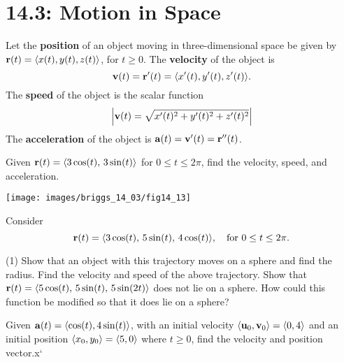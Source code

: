 \documentclass[mathNotesPreamble]{subfiles}
\begin{document}
\section{14.3: Motion in Space}
  \begin{defn*}
    Let the \textbf{position} of an object moving in three-dimensional space be given by \newline${\mathbf{r}}(t)={\left\langle x(t),y(t),z(t) \right\rangle}$, for $t\geq 0$. The \textbf{velocity} of the object is
      \[{\mathbf{v}}(t)={\mathbf{r}}'(t)={\left\langle x'(t),y'(t),z'(t) \right\rangle}.\]
    The \textbf{speed} of the object is the scalar function
      \[{\left\vert{\mathbf{v}}(t)=\sqrt{x'(t)^2+y'(t)^2+z'(t)^2}\right\vert}\]
    The \textbf{acceleration} of the object is $\mathbf a(t)={\mathbf{v}}'(t)={\mathbf{r}}''(t)$.
  \end{defn*}
  \begin{ex*}
    Given ${\mathbf{r}}(t)={\left\langle 3\cos(t),\,3\sin(t) \right\rangle}$ for $0\leq t\leq 2\pi$, find the velocity, speed, and acceleration.
  \end{ex*}
  \begin{flushright}
    \texttt{[image: images/briggs\_14\_03/fig14\_13]}
  \end{flushright}
  \pagebreak

  \noindent
  \begin{ex*}
    Consider
      \[{\mathbf{r}}(t)={\left\langle 3\cos(t),\,5\sin(t),\,4\cos(t) \right\rangle},\quad\textnormal{for } 0\leq t\leq 2\pi.\]
  \end{ex*}
  \begin{tasks}[after-item-skip=\stretch{1}](1)
    \task Show that an object with this trajectory moves on a sphere and find the radius.
    \task Find the velocity and speed of the above trajectory.
    \task Show that ${\mathbf{r}}(t)={\left\langle 5\cos(t),\,5\sin(t),\,5\sin(2t) \right\rangle}$ does not lie on a sphere. How could this function be modified so that it does lie on a sphere?
  \end{tasks}
  \pagebreak

  \begin{ex*}
    Given $\mathbf a(t)={\left\langle \cos(t),4\sin(t) \right\rangle}$, with an initial velocity ${\left\langle {\mathbf{u}}_0,{\mathbf{v}}_0 \right\rangle}={\left\langle 0,4 \right\rangle}$ and an initial position ${\left\langle x_0,y_0 \right\rangle}={\left\langle 5,0 \right\rangle}$ where $t\geq 0$, find the velocity and position vector.x`
  \end{ex*}
  \pagebreak
\end{document}
